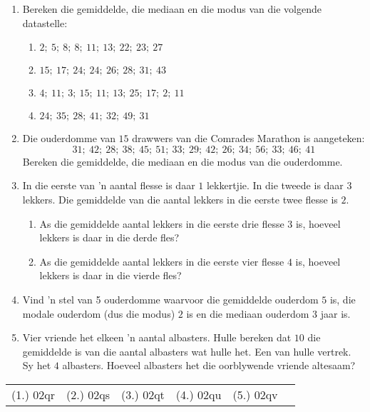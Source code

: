 \begin{exercises}{}{
    \begin{enumerate}[noitemsep, label=\textbf{\arabic*}.]

    \item Bereken die gemiddelde, die mediaan en die modus van die volgende datastelle:
      \begin{enumerate}[noitemsep, label=\textbf{(\alph*)} ]
      \item $2;~5;~8;~8;~11;~13;~22;~23;~27$
      \item $15;~17;~24;~24;~26;~28;~31;~43$
      \item $4;~11;~3;~15;~11;~13;~25;~17;~2;~11$
      \item $24;~35;~28;~41;~32;~49;~31$
      \end{enumerate}
    \item Die ouderdomme van $15$ drawwers van die  Comrades Marathon is aangeteken:
      \begin{equation*}
        31;~42;~28;~38;~45;~51;~33;~29;~42;~26;~34;~56;~33;~46;~41
      \end{equation*}
      Bereken die gemiddelde, die mediaan en die modus van die ouderdomme.
    \item In die eerste van ’n aantal flesse is daar $1$ lekkertjie. In die tweede is daar $3$ lekkers. Die gemiddelde van die aantal lekkers in die eerste twee flesse is $2$.
      \begin{enumerate}[noitemsep, label=\textbf{(\alph*)} ]
      \item As die gemiddelde aantal lekkers in die eerste drie flesse $3$ is, hoeveel lekkers is daar in die derde fles?
      \item As die gemiddelde aantal lekkers in die eerste vier flesse $4$ is, hoeveel lekkers is daar in die vierde fles?
      \end{enumerate}
    \item Vind ’n stel van 5 ouderdomme waarvoor die gemiddelde ouderdom $5$ is, die modale ouderdom (dus die modus) $2$ is en die mediaan ouderdom $3$ jaar is.
    \item Vier vriende het elkeen ’n aantal albasters. Hulle bereken dat $10$ die gemiddelde is van die aantal albasters wat hulle het. Een van hulle vertrek. Sy het $4$ albasters. Hoeveel albasters het die oorblywende vriende altesaam?
    \end{enumerate}
\par \practiceinfo
\par \begin{tabular}[h]{cccccc}
(1.)	02qr	&
(2.)	02qs	&
(3.)	02qt	&
(4.)	02qu	&
(5.)	02qv	&
\end{tabular}
}
\end{exercises}

